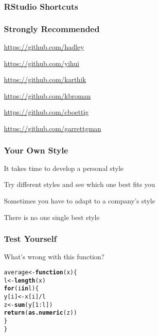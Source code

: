 \documentclass[12pt]{beamer}\usepackage[]{graphicx}\usepackage[]{color}
\makeatletter
\newcommand{\hlnum}[1]{\textcolor[rgb]{0.686,0.059,0.569}{#1}}%
\newcommand{\hlopt}[1]{\textcolor[rgb]{0,0,0}{#1}}%
\newcommand{\hlstd}[1]{\textcolor[rgb]{0.345,0.345,0.345}{#1}}%
\newcommand{\hlkwa}[1]{\textcolor[rgb]{0.161,0.373,0.58}{\textbf{#1}}}%
\newcommand{\hlkwb}[1]{\textcolor[rgb]{0.69,0.353,0.396}{#1}}%
\newcommand{\hlkwc}[1]{\textcolor[rgb]{0.333,0.667,0.333}{#1}}%
\newcommand{\hlkwd}[1]{\textcolor[rgb]{0.737,0.353,0.396}{\textbf{#1}}}%
\newenvironment{kframe}{%
 \def\at@end@of@kframe{}%
 \ifinner\ifhmode%
  \def\at@end@of@kframe{\end{minipage}}%
  \begin{minipage}{\columnwidth}%
 \fi\fi%
 \def\FrameCommand##1{\hskip\@totalleftmargin \hskip-\fboxsep
 \colorbox{shadecolor}{##1}\hskip-\fboxsep
     \hskip-\linewidth \hskip-\@totalleftmargin \hskip\columnwidth}%
 \MakeFramed {\advance\hsize-\width
   \@totalleftmargin\z@ \linewidth\hsize
   \@setminipage}}%
 {\par\unskip\endMakeFramed%
 \at@end@of@kframe}
\newenvironment{knitrout}{}{} %
\makeatother
\begin{document}

\begin{frame}[fragile]
\frametitle{RStudio Shortcuts}
\begin{center}
\end{center}
\end{frame}


\begin{frame}
\frametitle{Strongly Recommended}

\bi
 \item \url{https://github.com/hadley}
 \item \url{https://github.com/yihui}
 \item \url{https://github.com/karthik}
 \item \url{https://github.com/kbroman}
 \item \url{https://github.com/cboettig}
 \item \url{https://github.com/garrettgman}
\ei
\eb

\end{frame}


\begin{frame}
\frametitle{Your Own Style}

\bi
 \item It takes time to develop a personal style
 \item Try different styles and see which one best fits you
 \item Sometimes you have to adapt to a company's style
 \item There is no one single best style
\ei

\end{frame}


\begin{frame}[fragile]
\frametitle{Test Yourself}

What's wrong with this function?
\begin{knitrout}\footnotesize
{}\color{fgcolor}\begin{kframe}
\begin{alltt}
\hlstd{average} \hlkwb{<-} \hlkwa{function}\hlstd{(}\hlkwc{x}\hlstd{) \{}
  \hlstd{l} \hlkwb{<-} \hlkwd{length}\hlstd{(x)}
  \hlkwa{for}\hlstd{(i} \hlkwa{in} \hlstd{l) \{}
    \hlstd{y[i]} \hlkwb{<-} \hlstd{x[i]}\hlopt{/}\hlstd{l}
    \hlstd{z} \hlkwb{<-} \hlkwd{sum}\hlstd{(y[}\hlnum{1}\hlopt{:}\hlstd{l])}
    \hlkwd{return}\hlstd{(}\hlkwd{as.numeric}\hlstd{(z))}
  \hlstd{\}}
\hlstd{\}}
\end{alltt}
\end{kframe}
\end{knitrout}

\end{frame}
\end{document}
